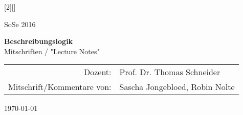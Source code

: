 [2][]{
    \thispagestyle{empty}

    \begin{minipage}[H]{\textwidth}
        \vspace{3.5cm}
        \begin{center}
                \Large SoSe 2016 

                \vspace{1cm}
                \LARGE \textbf{Beschreibungslogik} \\

                \vspace{3cm}
                \Large Mitschriften / "Lecture Notes"\\
        \end{center}
    \end{minipage}
    \vfill
    \vfill

    \begin{minipage}[H]{\textwidth}
        \begin{center}

                \begin{tabular}{ r l }
                  Dozent: & Prof. Dr. Thomas Schneider\\
                  Mitschrift/Kommentare von: & Sascha Jongebloed, Robin Nolte\\
                \end{tabular}
        \end{center}
    \end{minipage}
    \vspace{.5cm}

    \begin{center}
        \today
    \end{center}
    \newpage
}

\newcommand{\settableofcontents} {
    \setcounter{tocdepth}{4}
    \tableofcontents
    \newpage
}

\newcommand{\setbibliography} {
    \clearpage
    \phantomsection
    \label{ch:bib}%
    \addcontentsline{toc}{section}{Literatur}%
        \nocite{*}%
}
